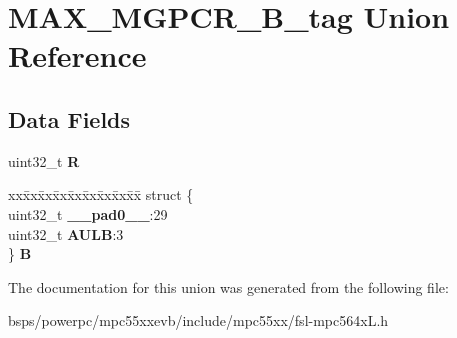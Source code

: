 \hypertarget{unionMAX__MGPCR__32B__tag}{}\section{M\+A\+X\+\_\+\+M\+G\+P\+C\+R\+\_\+B\+\_\+tag Union Reference}
\label{unionMAX__MGPCR__32B__tag}
\subsection*{Data Fields}
\begin{DoxyCompactItemize}
\item 
\mbox{\label{unionMAX__MGPCR__32B__tag_a3d571af07492a8f06778cd46b41ff684}} 
uint32\+\_\+t {\bfseries R}
\item 
\mbox{\label{unionMAX__MGPCR__32B__tag_a3943b3b2f627ee4bd9fccf85fb994546}} 
\begin{tabbing}
xx\=xx\=xx\=xx\=xx\=xx\=xx\=xx\=xx\=\kill
struct \{\\
\>uint32\_t {\bfseries \_\_pad0\_\_}:29\\
\>uint32\_t {\bfseries AULB}:3\\
\} {\bfseries B}\\

\end{tabbing}\end{DoxyCompactItemize}


The documentation for this union was generated from the following file\+:\begin{DoxyCompactItemize}
\item 
bsps/powerpc/mpc55xxevb/include/mpc55xx/fsl-\/mpc564x\+L.\+h\end{DoxyCompactItemize}
